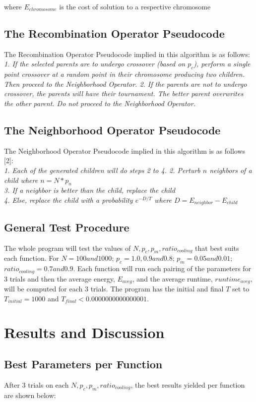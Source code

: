 \documentclass{article}
\begin{document}
where $E_{chromosome}$ is the cost of solution to a respective chromosome

\subsection{The Recombination Operator Pseudocode}
The Recombination Operator Pseudocode implied in this algorithm is as follows:\\
\textit{
1. If the selected parents are to undergo crossover (based on $p_c$), perform a single point crossover at a random point in their chromosome producing two children. Then proceed to the Neighborhood Operator.
2. If the parents are not to undergo crossover, the parents will have their tournament. The better parent overwrites the other parent. Do not proceed to the Neighborhood Operator.
}

\subsection{The Neighborhood Operator Pseudocode}
The Neighborhood Operator Pseudocode implied in this algorithm is as follows [2]:\\
\textit{
1. Each of the generated children will do steps 2 to 4.
2. Perturb $n$ neighbors of a child where $n = N*p_n$\\
3. If a neighbor is better than the child, replace the child\\
4. Else, replace the child with a probability $e^{-D/T}$ where $D = E_{neighbor} - E_{child}$\\
}

\subsection{General Test Procedure}
The whole program will test the values of $N, p_c, p_m, ratio_{cooling}$ that best suits each function. For $N = 100 and 1000$; $p_c = 1.0, 0.9 and 0.8$; $p_m = 0.05 and 0.01$; $ratio_{cooling} = 0.7 and 0.9$. Each function will run each pairing of the parameters for 3 trials and then the average energy, $E_{aveg}$, and the average runtime, $runtime_{aveg}$, will be computed for each 3 trials. The program has the initial and final $T$ set to $T_{initial} = 1000$ and $T_{final} < 0.0000000000000001$.

\section{Results and Discussion}
\subsection{Best Parameters per Function}
After 3 trials on each $N, p_c, p_m, ratio_{cooling}$, the best results yielded per function are shown below:\\
\end{document}
